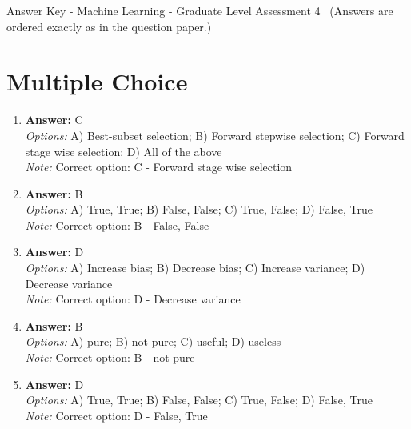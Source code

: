 \documentclass[12pt]{article}
\begin{document}
\begin{center}
Answer Key - Machine Learning - Graduate Level Assessment 4 \
\small (Answers are ordered exactly as in the question paper.)
\end{center}

\section*{Multiple Choice}
\begin{enumerate}[label=\arabic*.]
\item \textbf{Answer:} C
\\ \textit{Options:} A) Best-subset selection; B) Forward stepwise selection; C) Forward stage wise selection; D) All of the above
\\ \textit{Note:} Correct option: C - Forward stage wise selection
\item \textbf{Answer:} B
\\ \textit{Options:} A) True, True; B) False, False; C) True, False; D) False, True
\\ \textit{Note:} Correct option: B - False, False
\item \textbf{Answer:} D
\\ \textit{Options:} A) Increase bias; B) Decrease bias; C) Increase variance; D) Decrease variance
\\ \textit{Note:} Correct option: D - Decrease variance
\item \textbf{Answer:} B
\\ \textit{Options:} A) pure; B) not pure; C) useful; D) useless
\\ \textit{Note:} Correct option: B - not pure
\item \textbf{Answer:} D
\\ \textit{Options:} A) True, True; B) False, False; C) True, False; D) False, True
\\ \textit{Note:} Correct option: D - False, True
\end{enumerate}
\end{document}
